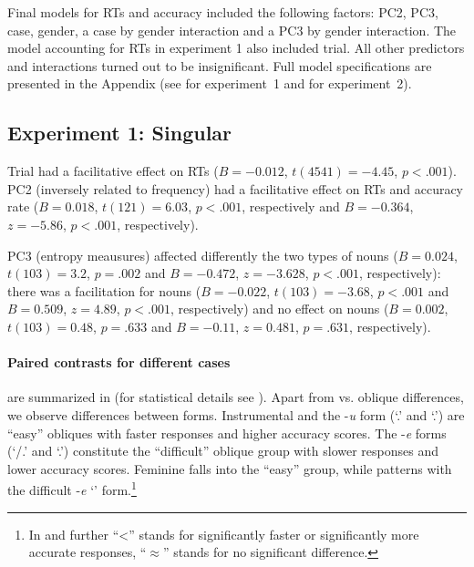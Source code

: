 \documentclass[output=paper, modfonts,newtxmath,hidelinks]{langscibook}
\begin{document}
Final models for RTs and accuracy included the following factors: PC2, PC3, case, gender, a case by gender interaction and a PC3 by gender interaction. The model accounting for RTs in experiment 1 also included trial. All other predictors and interactions turned out to be insignificant. Full model specifications are presented in the Appendix (see  for experiment~1 and  for experiment~2).

\subsection{Experiment 1: Singular}

Trial had a facilitative effect on RTs ($B=-0.012$, $t(4541)=-4.45$, $p<.001$). PC2 (inversely related to frequency) had a facilitative effect on RTs and accuracy rate ($B= 0.018$, $t(121)= 6.03$, $p< .001$, respectively and $B= -0.364$, $z= -5.86$, $p< .001$, respectively). 

PC3 (entropy meausures) affected differently the two types of nouns ($B= 0.024$, $t(103)= 3.2$, $p= .002$ and $B= -0.472$, $z= -3.628$, $p< .001$, respectively):  there was a facilitation for  nouns ($B= -0.022$, $t(103)= -3.68$, $p< .001$ and $B= 0.509$, $z= 4.89$, $p< .001$, respectively) and no effect on  nouns ($B= 0.002$, $t(103)= 0.48$, $p= .633$ and $B= -0.11$, $z= 0.481$, $p= .631$, respectively).

\paragraph*{Paired contrasts for different cases} are summarized in  (for statistical details see ). Apart from  vs. oblique differences, we observe differences between  forms. Instrumental and the -\textit{u} form (`\accc.\fem' and `\datt.\masc') are ``easy'' obliques with faster responses and higher accuracy scores. The -\textit{e} forms (`\datt/\locc.\fem' and `\locc.\masc') constitute the ``difficult'' oblique group with slower responses and lower accuracy scores. Feminine  falls into the ``easy'' group, while   patterns with the difficult -\textit{e} `\locc' form.\footnote{In  and further ``<'' stands for significantly faster or significantly more accurate responses, ``$\approx$'' stands for no significant difference.}
\end{document}
